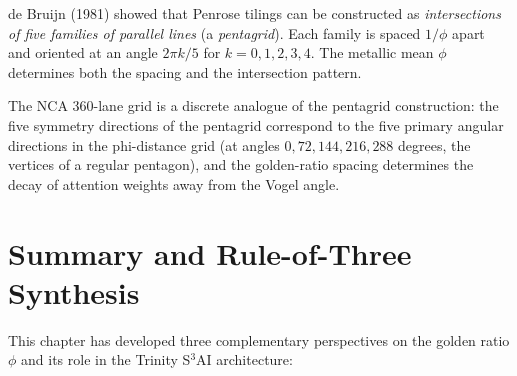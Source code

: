 de Bruijn (1981) showed that Penrose tilings can
be constructed as \emph{intersections of five
families of parallel lines} (a \emph{pentagrid}).
Each family is spaced $1/\phi$ apart and oriented
at an angle $2\pi k/5$ for $k = 0, 1, 2, 3, 4$.
The metallic mean $\phi$ determines both the
spacing and the intersection pattern.

The NCA 360-lane grid is a discrete analogue of
the pentagrid construction: the five symmetry
directions of the pentagrid correspond to the
five primary angular directions in the phi-distance
grid (at angles $0, 72, 144, 216, 288$ degrees,
the vertices of a regular pentagon), and the
golden-ratio spacing determines the decay of
attention weights away from the Vogel angle.

\section{Summary and Rule-of-Three Synthesis}
\label{sec:summary}

This chapter has developed three complementary
perspectives on the golden ratio $\phi$ and its
role in the Trinity S$^3$AI architecture:

